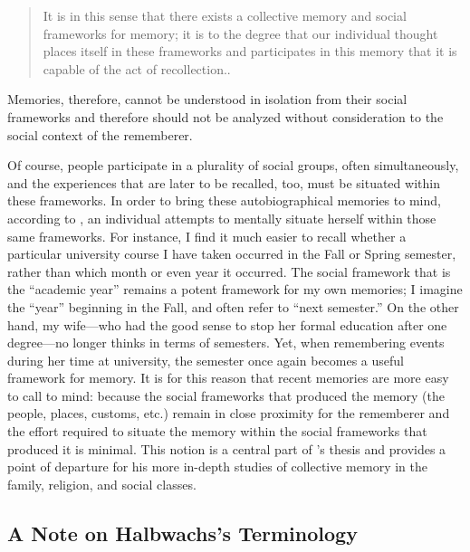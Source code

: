 \begin{quote} It is in this sense that there exists a collective memory and social frameworks for memory; it is to the degree that our individual thought places itself in these frameworks and participates in this memory that it is capable of the act of recollection.\autocite[38]{halbwachs1992}. \end{quote}  

Memories, therefore, cannot be understood in isolation from their social frameworks and therefore should not be analyzed without consideration to the social context of the rememberer.  

Of course, people participate in a plurality of social groups, often simultaneously, and the experiences that are later to be recalled, too, must be situated within these frameworks. In order to bring these autobiographical memories to mind, according to \halbwachs, an individual attempts to mentally situate herself within those same frameworks. For instance, I find it much easier to recall whether a particular university course I have taken occurred in the Fall or Spring semester, rather than which month or even year it occurred. The social framework that is the ``academic year'' remains a potent framework for my own memories; I imagine the ``year'' beginning in the Fall, and often refer to ``next semester.'' On the other hand, my wife---who had the good sense to stop her formal education after one degree---no longer thinks in terms of semesters. Yet, when remembering events during her time at university, the semester once again becomes a useful framework for memory. It is for this reason that recent memories are more easy to call to mind: because the social frameworks that produced the memory (the people, places, customs, etc.) remain in close proximity for the rememberer and the effort required to situate the memory within the social frameworks that produced it is minimal.\autocite[52]{halbwachs1992} This notion is a central part of \halbwachs's thesis and provides a point of departure for his more in-depth studies of collective memory in the family, religion, and social classes.  

\hypertarget{a-note-on-halbwachss-terminology}{%
\subsection{A Note on Halbwachs's Terminology}\label{a-note-on-halbwachss-terminology}}  

